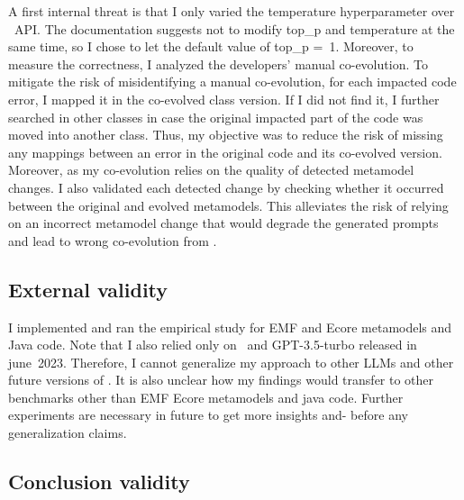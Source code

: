 A first internal threat is that I only varied the temperature hyperparameter over \LLM~API. The documentation suggests not to modify top\_p and temperature at the same time, so I chose to let the default value of top\_p =~1. 
Moreover, to measure the correctness, I analyzed the developers' manual co-evolution.
To mitigate the risk of misidentifying a manual co-evolution, for each impacted code error, I mapped it in the co-evolved class version. If I did not find it, I further searched in other classes in case the original impacted part of the code was moved into another class. Thus, my objective was to reduce the risk of missing any mappings between an error in the original code and its co-evolved version. Moreover, as my co-evolution relies on the quality of detected metamodel changes. I also validated each detected change by checking whether it occurred between the original and evolved metamodels. This alleviates the risk of relying on an incorrect metamodel change that would degrade the generated prompts and lead to wrong co-evolution from \LLM. 

\subsection{External validity}

I implemented and ran the empirical study for EMF and Ecore metamodels and Java code. Note that  
I also relied only on \LLM~and GPT-3.5-turbo released in june~2023. 
Therefore, I cannot generalize my approach to other LLMs and other future versions of \LLM. It is also unclear how my findings would transfer to other benchmarks other than EMF Ecore metamodels and java code. Further experiments are necessary in future to get more insights and- before any generalization claims.  
\subsection{Conclusion validity}

